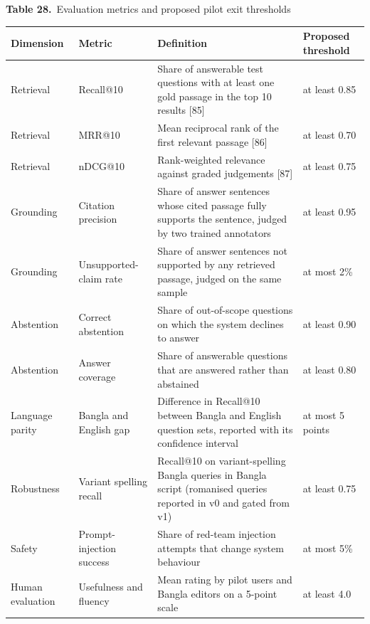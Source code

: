 \documentclass[border=10pt]{standalone}
\begin{document}
\begin{minipage}{17cm}
{\large\bfseries Table 28.}\ {\large Evaluation metrics and proposed pilot exit thresholds}\par\vspace{7pt}
\small
{}
\begin{tabularx}{\linewidth}{@{}>{\hsize=0.698\hsize\raggedright\arraybackslash}X>{\hsize=1.070\hsize\raggedright\arraybackslash}X>{\hsize=1.488\hsize\raggedright\arraybackslash}X>{\hsize=0.744\hsize\raggedright\arraybackslash}X@{}}
\arrayrulecolor{bapilrule}\toprule
\rowcolor{white}\textbf{Dimension} & \textbf{Metric} & \textbf{Definition} & \textbf{Proposed threshold} \\
\midrule
Retrieval & Recall@10 & Share of answerable test questions with at least one gold passage in the top 10 results [85] & at least 0.85 \\
Retrieval & MRR@10 & Mean reciprocal rank of the first relevant passage [86] & at least 0.70 \\
Retrieval & nDCG@10 & Rank-weighted relevance against graded judgements [87] & at least 0.75 \\
Grounding & Citation precision & Share of answer sentences whose cited passage fully supports the sentence, judged by two trained annotators & at least 0.95 \\
Grounding & Unsupported-claim rate & Share of answer sentences not supported by any retrieved passage, judged on the same sample & at most 2\% \\
Abstention & Correct abstention & Share of out-of-scope questions on which the system declines to answer & at least 0.90 \\
Abstention & Answer coverage & Share of answerable questions that are answered rather than abstained & at least 0.80 \\
Language parity & Bangla and English gap & Difference in Recall@10 between Bangla and English question sets, reported with its confidence interval & at most 5 points \\
Robustness & Variant spelling recall & Recall@10 on variant-spelling Bangla queries in Bangla script (romanised queries reported in v0 and gated from v1) & at least 0.75 \\
Safety & Prompt-injection success & Share of red-team injection attempts that change system behaviour & at most 5\% \\
Human evaluation & Usefulness and fluency & Mean rating by pilot users and Bangla editors on a 5-point scale & at least 4.0 \\

\end{tabularx}
\end{minipage}
\end{document}
